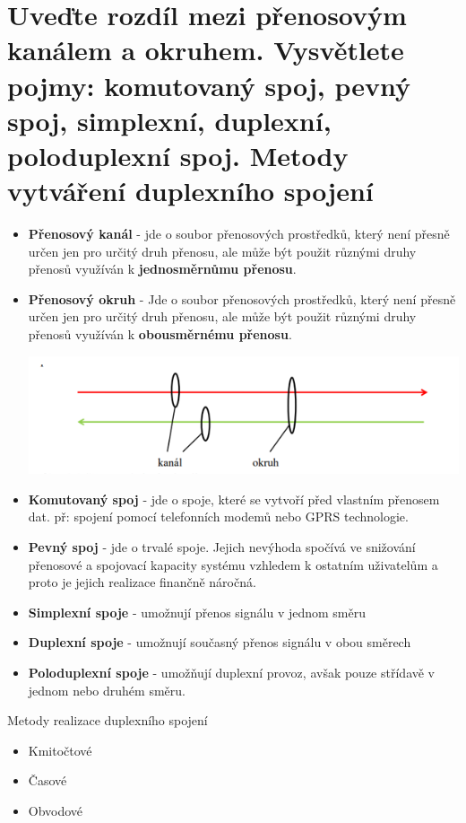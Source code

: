 \section{Uveďte rozdíl mezi přenosovým kanálem a okruhem. Vysvětlete pojmy: komutovaný spoj, pevný spoj, simplexní, duplexní, poloduplexní spoj. Metody vytváření duplexního spojení}
\begin{itemize}
    \item \textbf{Přenosový kanál} - jde o soubor přenosových prostředků, který není přesně určen jen pro určitý druh přenosu, ale může být použit různými druhy přenosů využíván k  \textbf{jednosměrnůmu přenosu}.

    \item \textbf{Přenosový okruh} - Jde o soubor přenosových prostředků, který není přesně určen jen pro určitý druh přenosu, ale může být použit různými druhy přenosů využíván k \textbf{obousměrnému přenosu}.
    
    \includegraphics[]{images/okruh_kanal.png}
    
    \item \textbf{Komutovaný spoj} - jde o spoje, které se vytvoří před vlastním přenosem dat. př: spojení pomocí telefonních modemů nebo GPRS technologie.
    \item \textbf{Pevný spoj} - jde o trvalé spoje. Jejich nevýhoda spočívá ve snižování přenosové a spojovací kapacity systému vzhledem k ostatním uživatelům a proto je jejich realizace finančně náročná.
    \item \textbf{Simplexní spoje} - umožnují přenos signálu v jednom směru
    \item \textbf{Duplexní spoje} - umožnují současný přenos signálu v obou směrech
    \item \textbf{Poloduplexní spoje} - umožňují duplexní provoz, avšak pouze střídavě v jednom nebo druhém směru.
\end{itemize}
Metody realizace duplexního spojení
\begin{itemize}
    \item Kmitočtové
    \item Časové
    \item Obvodové
\end{itemize}

